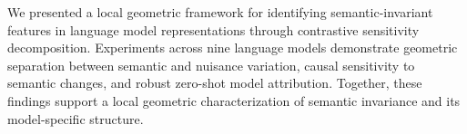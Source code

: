 
We presented a local geometric framework for identifying semantic-invariant features in language model representations through contrastive sensitivity decomposition. Experiments across nine language models demonstrate geometric separation between semantic and nuisance variation, causal sensitivity to semantic changes, and robust zero-shot model attribution. Together, these findings support a local geometric characterization of semantic invariance and its model-specific structure.
